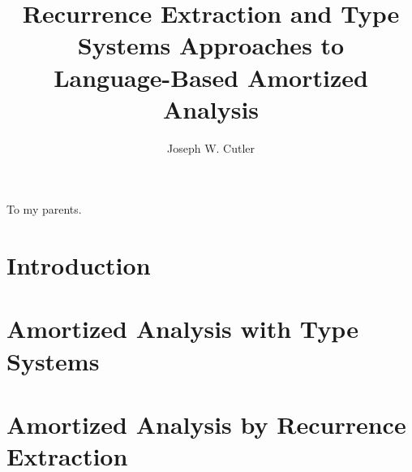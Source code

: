 \documentclass[draft]{westhesis}
\title{Recurrence Extraction and Type Systems Approaches to\\ Language-Based Amortized Analysis}
\author{Joseph W. Cutler}
\begin{document}
\begin{abstract}
\end{abstract}

\begin{dedication}
To my parents.
\end{dedication}

\begin{acknowledgements}
\end{acknowledgements}


\tableofcontents
\mainmatter


\chapter{Introduction}
%  

\chapter{Amortized Analysis with Type Systems}
\label{chap:lambda-amor}



\chapter{Amortized Analysis by Recurrence Extraction}
\label{chap:rec-extr}
%




\appendix
\renewcommand\chaptername{Appendix}

\chapter{}
\label{appendix:a}
%

\chapter{}
\label{appendix:b}
%
\end{document}
